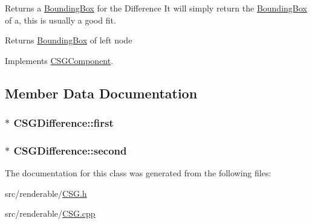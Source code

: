 Returns a \hyperlink{classBoundingBox}{Bounding\+Box} for the Difference It will simply return the \hyperlink{classBoundingBox}{Bounding\+Box} of a, this is usually a good fit. 

\begin{DoxyReturn}{Returns}
\hyperlink{classBoundingBox}{Bounding\+Box} of left node 
\end{DoxyReturn}


Implements \hyperlink{classCSGComponent_a4299365f2bab69272af9de4f2bee7cdb}{C\+S\+G\+Component}.



\subsection{Member Data Documentation}
\subsubsection[{\texorpdfstring{first}{first}}]{$\ast$ C\+S\+G\+Difference\+::first\hspace{0.3cm}{\ttfamily [private]}}\hypertarget{classCSGDifference_a689a622e9b4c43d72575cbbdd2ad847b}{}\label{classCSGDifference_a689a622e9b4c43d72575cbbdd2ad847b}
\subsubsection[{\texorpdfstring{second}{second}}]{$\ast$ C\+S\+G\+Difference\+::second\hspace{0.3cm}{\ttfamily [private]}}\hypertarget{classCSGDifference_ae9b4b0b0839d066ce30006d99536cd99}{}\label{classCSGDifference_ae9b4b0b0839d066ce30006d99536cd99}


The documentation for this class was generated from the following files\+:\begin{DoxyCompactItemize}
\item 
src/renderable/\hyperlink{CSG_8h}{C\+S\+G.\+h}\item 
src/renderable/\hyperlink{CSG_8cpp}{C\+S\+G.\+cpp}\end{DoxyCompactItemize}
